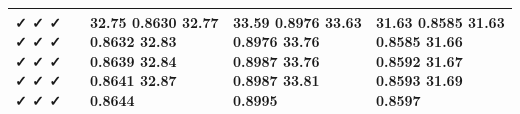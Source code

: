 \begin{tabular}{llll}
\toprule
✓ ✓ ✓ ✓ ✓ ✓ ✓ ✓ ✓ ✓ ✓ ✓ ✓ ✓ ✓ & 32.75 0.8630 32.77 0.8632 32.83 0.8639 32.84 0.8641 32.87 0.8644 & 33.59 0.8976 33.63 0.8976 33.76 0.8987 33.76 0.8987 33.81 0.8995 & 31.63 0.8585 31.63 0.8585 31.66 0.8592 31.67 0.8593 31.69 0.8597 \\
\midrule
\bottomrule
\end{tabular}

